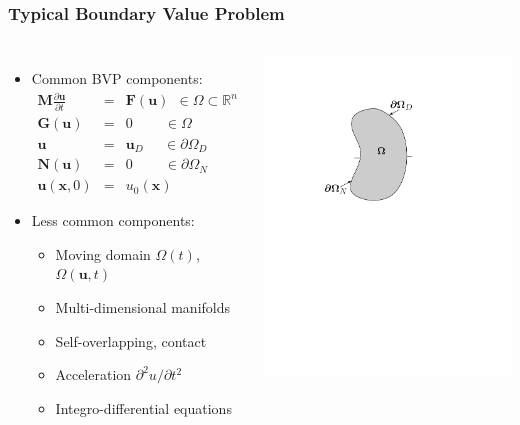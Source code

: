 \documentclass[mathserif]{beamer}
\newcommand{\bv}[1]{{\boldsymbol{#1}}}
\newcommand{\Reals}{\mathbb{R}}
\begin{document}
\begin{frame}[t]
  \frametitle{Typical Boundary Value Problem}
  \begin{columns}[t]
     \begin{itemize}
      \item Common BVP components:
      \vspace{-.1in}
        \begin{eqnarray}
	\label{eqn:general_pde}
	\nonumber
	\bv{M} \frac{\partial \bv{u}}{\partial t} & = & \bv{F}( \bv{u} ) \;\, \in \Omega \subset \Reals^n
        \\
	\nonumber
	\bv{G}( \bv{u} ) & = & 0 \;\;\;\;\;\;\;\; \in \Omega
	\\
	\nonumber
	\bv{u} & = & \bv{u}_D \;\;\;\;\; \in \partial \Omega_D
	\\
	\nonumber
	\bv{N}(\bv{u}) & = & 0 \;\;\;\;\;\;\;\; \in \partial \Omega_N
 	\\
 	\nonumber
 	\bv{u}(\bv{x}, 0) & = & u_0(\bv{x}) 
      \end{eqnarray}
      \item Less common components:
        \begin{itemize}
        \item Moving domain $\Omega(t)$, $\Omega(\bv{u},t)$
        \item Multi-dimensional manifolds
        \item Self-overlapping, contact
        \item Acceleration ${\partial^2 u}/{\partial t^2}$
        \item Integro-differential equations
        \end{itemize}
      \end{itemize}
      \begin{center}
	\includegraphics[viewport=140 420 400 685,clip=true,width=.5\textwidth]{domain2_input}

\end{center}
\end{columns}
\end{frame}
\end{document}
